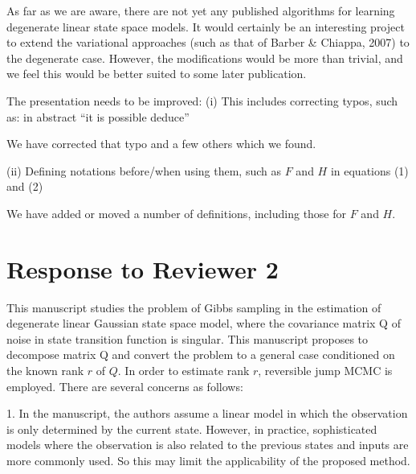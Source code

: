 \documentclass{article}
\newenvironment{review}[0]{\begin{itshape}\color{Gray}\noindent}{\end{itshape}\vspace{0.4cm}}
\newenvironment{response}[0]{\noindent}{\vspace{0.4cm}}
\begin{document}
\begin{response}
 As far as we are aware, there are not yet any published algorithms for learning degenerate linear state space models. It would certainly be an interesting project to extend the variational approaches (such as that of Barber \& Chiappa, 2007) to the degenerate case. However, the modifications would be more than trivial, and we feel this would be better suited to some later publication.
\end{response}

\begin{review}
The presentation needs to be improved:
(i) This includes correcting typos, such as: in abstract ``it is possible deduce''
\end{review}

\begin{response}
 We have corrected that typo and a few others which we found.
\end{response}

\begin{review}
(ii) Defining notations before/when using them, such as $F$ and $H$ in equations (1) and (2)
\end{review}

\begin{response}
 We have added or moved a number of definitions, including those for $F$ and $H$.
\end{response}



\section*{Response to Reviewer 2}

\begin{review}
This manuscript studies the problem of Gibbs sampling in the estimation of degenerate linear Gaussian state space model, where the covariance matrix Q of noise in state transition function is singular. This manuscript proposes to decompose matrix Q and convert the problem to a general case conditioned on the known rank $r$ of $Q$. In order to estimate rank $r$, reversible jump MCMC is employed. There are several concerns as follows:

1.  In the manuscript, the authors assume a linear model in which the observation is only determined by the current state. However, in practice, sophisticated models where the observation is also related to the previous states and inputs are more commonly used. So this may limit the applicability of the proposed method.
\end{review}
\end{document}
